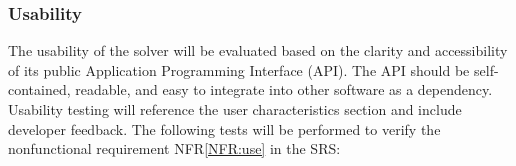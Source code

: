 \documentclass[12pt, titlepage]{article}
\newcommand{\tref}[1]{T\ref{#1}}
\newcommand{\nfrref}[1]{NFR\ref{#1}}
\begin{document}






\subsubsection{Usability}
\label{sec:usability}

The usability of the solver will be evaluated based on the clarity and
accessibility of its public Application Programming Interface (API). The API
should be self-contained, readable, and easy to integrate into other software as
a dependency. Usability testing will reference the user characteristics section
and include developer feedback. The following tests will be performed to verify
the nonfunctional requirement \nfrref{NFR:use} in the SRS:
\end{document}
